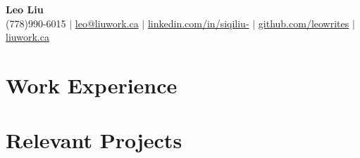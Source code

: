 \documentclass[letterpaper,11pt]{article}
\newcommand{\resumeSubHeadingListStart}{\begin{itemize}[leftmargin=0in, rightmargin=0in, label={}]}
\newcommand{\resumeSubHeadingListEnd}{\end{itemize}}
\begin{document}

\begin{center}
    {\Huge \color{blue}\textbf{Leo Liu}} \\
    (778)990-6015 $|$ \href{mailto:leo@liuwork.ca}{leo@liuwork.ca} $|$ 
    \href{https://linkedin.com/in/siqiliu-}{linkedin.com/in/siqiliu-} $|$
    \href{https://github.com/leowrites}{github.com/leowrites} $|$
    \href{https://liuwork.ca}{liuwork.ca}
    \vspace{-8pt}
\end{center}




\section{Work Experience}
    \resumeSubHeadingListStart
        
        
        
    \resumeSubHeadingListEnd


\section{Relevant Projects}
    \resumeSubHeadingListStart
        
        
    \resumeSubHeadingListEnd
\end{document}
